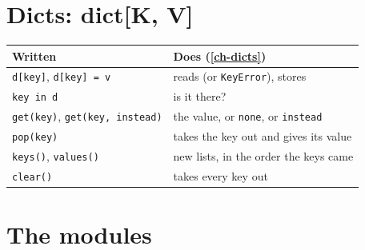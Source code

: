 \section*{Dicts: dict[K, V]}

\begin{center}
\begin{longtable}{lP{8.1cm}}
\toprule
Written & Does (\hyperref[ch-dicts]{\ref*{ch-dicts}}) \\
\midrule
\endhead
\verb|d[key]|, \verb|d[key] = v| & reads (or \verb|KeyError|), stores \\
\verb|key in d| & is it there? \\
\verb|get(key)|, \verb|get(key, instead)| & the value, or \verb|none|, or \verb|instead| \\
\verb|pop(key)| & takes the key out and gives its value \\
\verb|keys()|, \verb|values()| & new lists, in the order the keys came \\
\verb|clear()| & takes every key out \\
\bottomrule
\end{longtable}
\end{center}

\section*{The modules}

